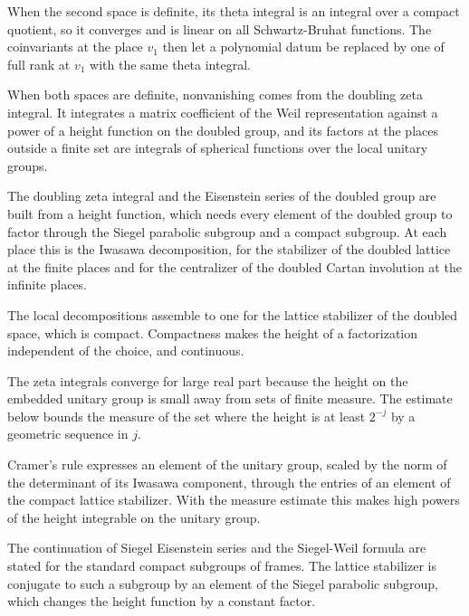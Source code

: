 When the second space is definite, its theta integral is an integral over a
compact quotient, so it converges and is linear on all Schwartz-Bruhat
functions. The coinvariants at the place $v_1$ then let a polynomial datum be
replaced by one of full rank at $v_1$ with the same theta integral.

When both spaces are definite, nonvanishing comes from the doubling zeta
integral. It integrates a matrix coefficient of the Weil representation
against a power of a height function on the doubled group, and its factors at
the places outside a finite set are integrals of spherical functions over the
local unitary groups.

The doubling zeta integral and the Eisenstein series of the doubled group are
built from a height function, which needs every element of the doubled group to
factor through the Siegel parabolic subgroup and a compact subgroup. At each
place this is the Iwasawa decomposition, for the stabilizer of the doubled
lattice at the finite places and for the centralizer of the doubled Cartan
involution at the infinite places.

The local decompositions assemble to one for the lattice stabilizer of the
doubled space, which is compact. Compactness makes the height of a
factorization independent of the choice, and continuous.

The zeta integrals converge for large real part because the height on the
embedded unitary group is small away from sets of finite measure. The estimate
below bounds the measure of the set where the height is at least $2^{-j}$ by a
geometric sequence in $j$.

Cramer's rule expresses an element of the unitary group, scaled by the norm of
the determinant of its Iwasawa component, through the entries of an element of
the compact lattice stabilizer. With the measure estimate this makes high
powers of the height integrable on the unitary group.

The continuation of Siegel Eisenstein series and the Siegel-Weil formula are
stated for the standard compact subgroups of frames. The lattice stabilizer is
conjugate to such a subgroup by an element of the Siegel parabolic subgroup,
which changes the height function by a constant factor.

